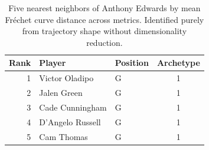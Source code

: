 \begin{table}[htbp]
  \centering\small
  \begin{tabular}{rllc}
    \toprule
    Rank & Player & Position & Archetype \\
    \midrule
    1 & Victor Oladipo & G & 1 \\
    2 & Jalen Green & G & 1 \\
    3 & Cade Cunningham & G & 1 \\
    4 & D'Angelo Russell & G & 1 \\
    5 & Cam Thomas & G & 1 \\
    \bottomrule
  \end{tabular}
  \caption{Five nearest neighbors of Anthony Edwards by mean Fr\'{e}chet curve distance across metrics. Identified purely from trajectory shape without dimensionality reduction.}
  \label{tab:Anthony_Edwards_frechet_curve_neighbors}
\end{table}

